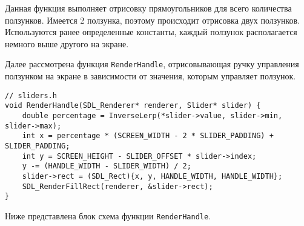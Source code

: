 \documentclass[14pt]{extarticle}
\begin{document}
{\begin{center}
\begin{tikzpicture}[transform shape, scale=0.7]
        
    \end{tikzpicture}
    \end{center}
    
    \begin{spacing}{1.5}
        Данная функция выполняет отрисовку прямоугольников для всего количества ползунков. Имеется 2 ползунка, поэтому происходит отрисовка двух ползунков. Используются ранее определенные константы, каждый ползунок располагается немного выше другого на экране.
        \par
        Далее рассмотрена функция \verb|RenderHandle|, отрисовывающая ручку управления ползунком на экране в зависимости от значения, которым управляет ползунок.
    \end{spacing}

    \begin{lstlisting}
// sliders.h
void RenderHandle(SDL_Renderer* renderer, Slider* slider) {
	double percentage = InverseLerp(*slider->value, slider->min, slider->max);
	int x = percentage * (SCREEN_WIDTH - 2 * SLIDER_PADDING) + SLIDER_PADDING;
	int y = SCREEN_HEIGHT - SLIDER_OFFSET * slider->index;
	y -= (HANDLE_WIDTH - SLIDER_WIDTH) / 2;
	slider->rect = (SDL_Rect){x, y, HANDLE_WIDTH, HANDLE_WIDTH};
	SDL_RenderFillRect(renderer, &slider->rect);
}\end{lstlisting}

    \begin{spacing}{1.5}
        \noindent
        Ниже представлена блок схема функции \verb|RenderHandle|.
    \end{spacing}

}
\end{document}
